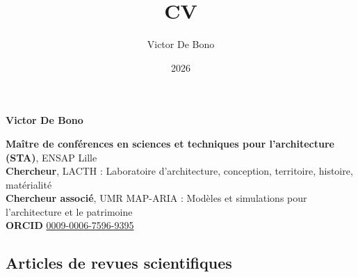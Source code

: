 \documentclass[11pt,a4paper]{article}
\title{CV}
\author{Victor De Bono}
\date{2026}
\begin{document}
\begin{center}
  {\LARGE\textbf{Victor De Bono}}\\[0.6em]
\end{center}

\textbf{Maître de conférences en sciences et techniques pour l'architecture (STA)}, ENSAP Lille\\
\textbf{Chercheur}, LACTH : Laboratoire d'architecture, conception, territoire, histoire, matérialité\\
\textbf{Chercheur associé}, UMR MAP-ARIA : Modèles et simulations pour l'architecture et le patrimoine\\
\textbf{ORCID} \href{https://orcid.org/0009-0006-7596-9395}{0009-0006-7596-9395}


\subsection*{Articles de revues scientifiques}
\end{document}
